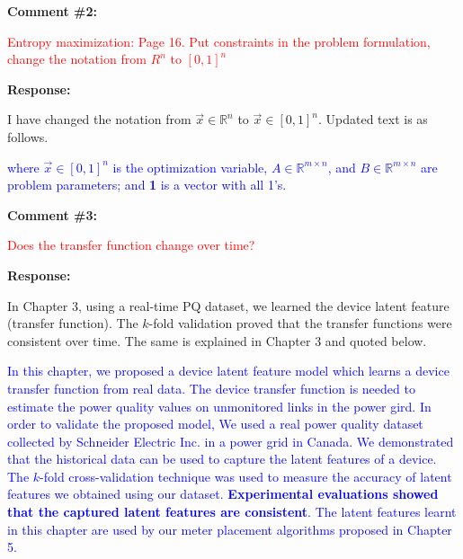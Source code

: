 \documentclass[journal]{IEEEtran}
\begin{document}
\vspace{30pt}
\textbf{Comment \#2:}
\begin{adjustwidth}{2.5em}{0pt}
\singlespacing \vspace{-10pt}
\textcolor{red}{Entropy maximization: Page 16. Put constraints in the problem formulation, change the notation from $R^n$ to $[0,1]^n$}
\end{adjustwidth}

\vspace{10pt}
\textbf{Response:}
\begin{adjustwidth}{2.5em}{0pt}
I have changed the notation from $\vec{x}\in \mathbb{R}^n$ to $\vec{x}\in [0, 1]^n$. Updated text is as follows.

\vspace{10pt}
\noindent\textcolor{blue}{where $\vec{x}\in [0, 1]^n$ is the optimization variable, $A \in \mathbb{R}^{m \times n}$, and $B \in \mathbb{R}^{m \times n}$ are problem parameters;  and \textbf{1} is a vector with all 1's.}
\end{adjustwidth}


\vspace{30pt}
\textbf{Comment \#3:}
\begin{adjustwidth}{2.5em}{0pt}
\singlespacing \vspace{-10pt}
\textcolor{red}{Does the transfer function change over time? }
\end{adjustwidth}

\vspace{10pt}
\textbf{Response:}
\begin{adjustwidth}{2.5em}{0pt}
In Chapter 3, using a real-time PQ dataset, we learned the device latent feature (transfer function). The $k$-fold validation proved that the transfer functions were consistent over time. The same is explained in Chapter 3 and quoted below.

\vspace{10pt}
\noindent\textcolor{blue}{In this chapter, we proposed a device latent feature model which learns a device transfer function from real data. The device transfer function is needed to estimate the power quality values on unmonitored links in the power gird. In order to validate the proposed model, We used a real power quality dataset collected by Schneider Electric Inc. in a power grid in Canada. We demonstrated that the historical data can be used to capture the latent features of a device. The $k$-fold cross-validation technique was used to measure the accuracy of latent features we obtained using our dataset. \textbf{Experimental evaluations showed that the captured latent features are consistent}. The latent features learnt in this chapter are used by our meter placement algorithms proposed in Chapter 5.}
\end{adjustwidth}
\end{document}
